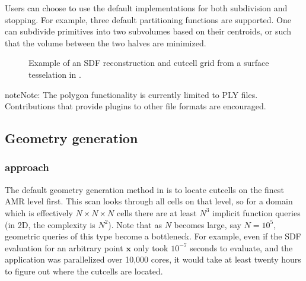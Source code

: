 \documentclass[letterpaper,10pt,english]{sphinxmanual}
\let\sphinxpxdimen\pdfpxdimen\else\newdimen\sphinxpxdimen
\begin{document}
Users can choose to use the default implementations for both sub\sphinxhyphen{}division and stopping.
For example, three default partitioning functions are supported.
One can sub\sphinxhyphen{}divide primitives into two sub\sphinxhyphen{}volumes based on their centroids, or such that the volume between the two halves are minimized.

\begin{figure}[htb]
\centering
\capstart

\noindent\sphinxincludegraphics[width=360\sphinxpxdimen]{{Armadillo}.png}
\caption{Example of an SDF reconstruction and cut\sphinxhyphen{}cell grid from a surface tesselation in .}\label{\detokenize{Source/SpatialDiscretization:id4}}\end{figure}

\begin{sphinxadmonition}{note}{Note:}
The polygon functionality is currently limited to PLY files.
Contributions that provide plugins to other file formats are encouraged.
\end{sphinxadmonition}


\subsection{Geometry generation}
\label{\detokenize{Source/SpatialDiscretization:geometry-generation}}\label{\detokenize{Source/SpatialDiscretization:chap-geometrygeneration}}

\subsubsection{ approach}
\label{\detokenize{Source/SpatialDiscretization:chombo-approach}}
The default geometry generation method in  is to locate cut\sphinxhyphen{}cells on the finest AMR level first.
This scan looks through all cells on that level, so for a domain which is effectively \(N\times N\times N\) cells there are at least \(N^3\) implicit function queries (in 2D, the complexity is \(N^2\)).
Note that as \(N\) becomes large, say \(N=10^5\), geometric queries of this type become a bottleneck.
For example, even if the SDF evaluation for an arbitrary point \(\mathbf{x}\) only took \(10^{-7}\) seconds to evaluate, and the application was parallelized over 10,000 cores, it would take at least twenty hours to figure out where the cut\sphinxhyphen{}cells are located.
\end{document}
